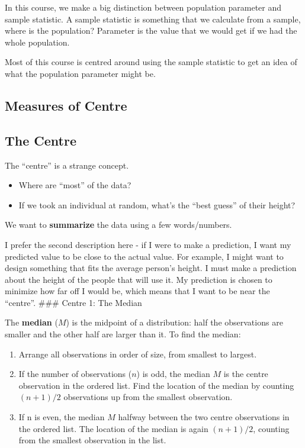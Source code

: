 \documentclass[
  letterpaper,
  DIV=11,
  numbers=noendperiod,
  oneside]{scrreprt}
\providecommand{\tightlist}{%
  \setlength{\itemsep}{0pt}\setlength{\parskip}{0pt}}\usepackage{longtable,booktabs,array}
\begin{document}
In this course, we make a big distinction between population parameter
and sample statistic. A sample statistic is something that we calculate
from a sample, where is the population? Parameter is the value that we
would get if we had the whole population.

Most of this course is centred around using the sample statistic to get
an idea of what the population parameter might be.

\hypertarget{measures-of-centre}{%
\subsection{Measures of Centre}\label{measures-of-centre}}

\hypertarget{the-centre}{%
\subsection{The Centre}\label{the-centre}}

The ``centre'' is a strange concept.

\begin{itemize}
\tightlist
\item
  Where are ``most'' of the data?
\item
  If we took an individual at random, what's the ``best guess'' of their
  height?
\end{itemize}

We want to \textbf{summarize} the data using a few words/numbers.

I prefer the second description here - if I were to make a prediction, I
want my predicted value to be close to the actual value. For example, I
might want to design something that fits the average person's height. I
must make a prediction about the height of the people that will use it.
My prediction is chosen to minimize how far off I would be, which means
that I want to be near the ``centre''. \#\#\# Centre 1: The Median

The \textbf{median} (\(M\)) is the midpoint of a distribution: half the
observations are smaller and the other half are larger than it. To find
the median:{}

\begin{enumerate}
\def\labelenumi{\arabic{enumi}.}
\tightlist
\item
  Arrange all observations in order of size, from smallest to largest.
\item
  If the number of observations (\(n\)) is odd, the median \(M\) is the
  centre observation in the ordered list. Find the location of the
  median by counting \((n + 1)/2\) observations up from the smallest
  observation.
\item
  If n is even, the median \(M\) halfway between the two centre
  observations in the ordered list. The location of the median is again
  \((n + 1)/2\), counting from the smallest observation in the list.
\end{enumerate}
\end{document}
